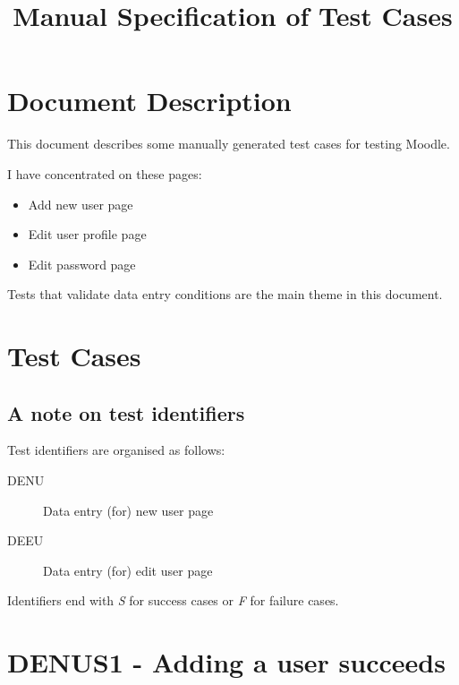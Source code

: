 \documentclass{article}
\title{Manual Specification of Test Cases}
\begin{document}
\maketitle


\tableofcontents

\section{Document Description}

This document describes some manually generated test cases for testing
Moodle.

I have concentrated on these pages:

\begin{itemize}
  \item Add new user page
  \item Edit user profile page
  \item Edit password page
\end{itemize}

Tests that validate data entry conditions are the main theme in this document.

\section{Test Cases}

\subsection{A note on test identifiers}

Test identifiers are organised as follows:

\begin{description}
  \item[DENU] Data entry (for) new user page
  \item[DEEU] Data entry (for) edit user page
\end{description}

Identifiers end with \emph{S} for success cases or \emph{F} for
failure cases.


\section*{DENUS1 - Adding a user succeeds}
\end{document}
